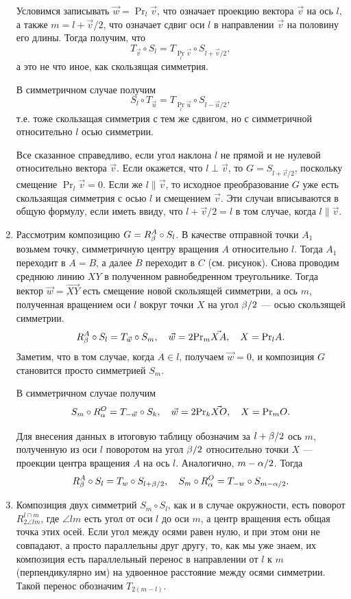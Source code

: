 \begin{enumerate}
Условимся записывать $\vec w=\Pr_l\vec v$, что означает проекцию вектора $\vec v$ на ось $l$, а также $m=l+\vec v/2$, что означает сдвиг оси $l$ в направлении $\vec v$ на половину его длины. Тогда получим, что
$$
T_{\vec v}\circ S_l = T_{\Pr_l\vec v}\circ S_{l+\vec v/2},
$$
а это не что иное, как скользящая симметрия.

В симметричном случае получим
$$
S_l\circ T_{\vec u} = T_{\Pr_l\vec u}\circ S_{l-\vec u/2},
$$
т.е. тоже скользащая симметрия с тем же сдвигом, но с симметричной относительно $l$ осью симметрии.

Все сказанное справедливо, если угол наклона $l$ не прямой и не нулевой относительно вектора $\vec v$. Если окажется, что $l\perp\vec v$, то $G=S_{l+\vec v/2}$, поскольку смещение $\Pr_l\vec v=0$. Если же $l\parallel\vec v$, то исходное преобразование $G$ уже есть скользаящая симметрия с осью $l$ и смещением $\vec v$. Эти случаи вписываются в общую формулу, если иметь ввиду, что $l+\vec v/2=l$ в том случае, когда $l\parallel\vec v$.

\item Рассмотрим композицию $G=R_\beta^A\circ S_l$. В качестве отправной точки $A_1$ возьмем точку, симметричную центру вращения $A$ относительно $l$. Тогда $A_1$ переходит в $A=B$, а далее $B$ переходит в $C$ (см. рисунок). Снова проводим среднюю линию $XY$ в полученном равнобедренном треугольнике. Тогда вектор $\vec w = \vec{XY}$ есть смещение новой скользящей симметрии, а ось $m$, полученная вращением оси $l$ вокруг точки $X$ на угол $\beta/2$ --- осью скользящей симметрии.
$$
R_\beta^A\circ S_l = T_{\vec w}\circ S_m,\quad \vec w  = 2 \mathrm{Pr}_m\vec{XA},\quad X = \mathrm{Pr}_lA.
$$
Заметим, что в том случае, когда $A\in l$, получаем $\vec w=0$, и композиция $G$ становится просто симметрией $S_m$.

В симметричном случае получим
$$
S_m\circ R_\alpha^O = T_{-\vec w}\circ S_k,\quad \vec w  = 2 \mathrm{Pr}_k\vec{XO},\quad X = \mathrm{Pr}_mO.
$$

Для внесения данных в итоговую таблицу обозначим за $l+\beta/2$ ось $m$, полученную из оси $l$ поворотом на угол $\beta/2$ относительно точки $X$ --- проекции центра вращения $A$ на ось $l$. Аналогично, $m-\alpha/2$. Тогда
$$
R_\beta^A\circ S_l = T_w\circ S_{l+\beta/2},\quad S_m\circ R_\alpha^O = T_{-w}\circ S_{m-\alpha/2}.
$$

\item Композиция двух симметрий $S_m\circ S_l$, как и в случае окружности, есть поворот $R_{2\angle lm}^{l\cap m}$, где $\angle lm$ есть угол от оси $l$ до оси $m$, а центр вращения есть общая точка этих осей. Если угол между осями равен нулю, и при этом они не совпадают, а просто параллельны друг другу, то, как мы уже знаем, их композиция есть параллельный перенос в направлении от $l$ к $m$ (перпендикулярно им) на удвоенное расстояние между осями симметрии. Такой перенос обозначим $T_{2(m-l)}$.


\end{enumerate}
